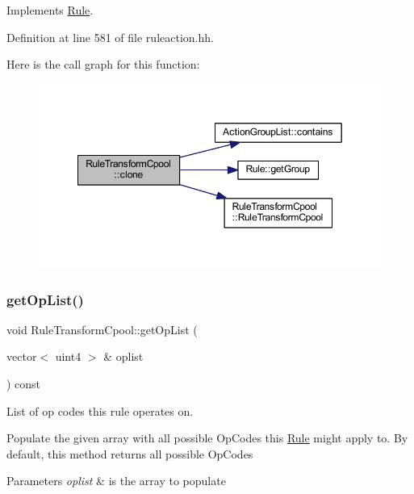 Implements \mbox{\hyperlink{class_rule_a70de90a76461bfa7ea0b575ce3c11e4d}{Rule}}.



Definition at line 581 of file ruleaction.\+hh.

Here is the call graph for this function\+:
\nopagebreak
\begin{figure}[H]
\begin{center}
\leavevmode
\includegraphics[width=349pt]{class_rule_transform_cpool_a0221ad873217f4dbad2e59e5ef37e23e_cgraph}
\end{center}
\end{figure}
\mbox{\label{class_rule_transform_cpool_ab979cb5eb69370d2fbdc014578d1a958}} 
\subsubsection{\texorpdfstring{getOpList()}{getOpList()}}
{\footnotesize\ttfamily void Rule\+Transform\+Cpool\+::get\+Op\+List (\begin{DoxyParamCaption}\item[{vector$<$ uint4 $>$ \&}]{oplist }\end{DoxyParamCaption}) const\hspace{0.3cm}{\ttfamily [virtual]}}



List of op codes this rule operates on. 

Populate the given array with all possible Op\+Codes this \mbox{\hyperlink{class_rule}{Rule}} might apply to. By default, this method returns all possible Op\+Codes 
\begin{DoxyParams}{Parameters}
{\em oplist} & is the array to populate \\
\hline
\end{DoxyParams}


